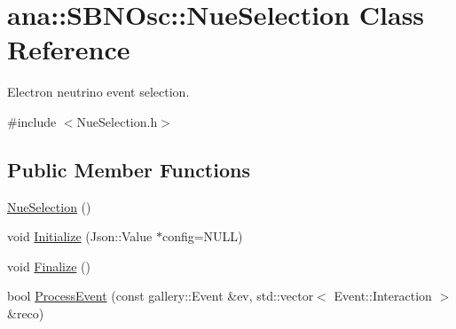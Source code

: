 \hypertarget{classana_1_1SBNOsc_1_1NueSelection}{
\section{ana::SBNOsc::NueSelection Class Reference}
\label{classana_1_1SBNOsc_1_1NueSelection}
}


Electron neutrino event selection.  


{\ttfamily \#include $<$NueSelection.h$>$}\subsection*{Public Member Functions}
\begin{DoxyCompactItemize}
\item 
\hyperlink{classana_1_1SBNOsc_1_1NueSelection_aa7520d861b94192521dd188b6ef4a7a5}{NueSelection} ()
\item 
void \hyperlink{classana_1_1SBNOsc_1_1NueSelection_a65827f6f5670431cad9479d6e9c3a3dc}{Initialize} (Json::Value $\ast$config=NULL)
\item 
void \hyperlink{classana_1_1SBNOsc_1_1NueSelection_a27bfa9d84344b8615e26f03f49a0a618}{Finalize} ()
\item 
bool \hyperlink{classana_1_1SBNOsc_1_1NueSelection_a5c633a75ee3f7bdbcb5b09c253595377}{ProcessEvent} (const gallery::Event \&ev, std::vector$<$ Event::Interaction $>$ \&reco)
\end{DoxyCompactItemize}

